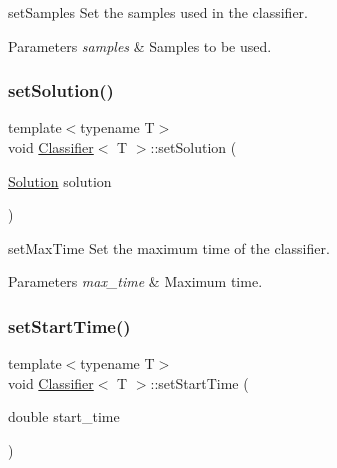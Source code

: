 set\+Samples Set the samples used in the classifier. 


\begin{DoxyParams}{Parameters}
{\em samples} & Samples to be used. \\
\hline
\end{DoxyParams}
\mbox{\label{class_classifier_a2eb8d760224eba3091c108155996d3d9}} 
\subsubsection{\texorpdfstring{set\+Solution()}{setSolution()}}
{\footnotesize\ttfamily template$<$typename T$>$ \\
void \mbox{\hyperlink{class_classifier}{Classifier}}$<$ T $>$\+::set\+Solution (\begin{DoxyParamCaption}\item[{\mbox{\hyperlink{class_solution}{Solution}}}]{solution }\end{DoxyParamCaption})\hspace{0.3cm}{\ttfamily [inline]}}



set\+Max\+Time Set the maximum time of the classifier. 


\begin{DoxyParams}{Parameters}
{\em max\+\_\+time} & Maximum time. \\
\hline
\end{DoxyParams}
\mbox{\label{class_classifier_a92fd489e75afe8b1bd2c88c478cf8f60}} 
\subsubsection{\texorpdfstring{set\+Start\+Time()}{setStartTime()}}
{\footnotesize\ttfamily template$<$typename T$>$ \\
void \mbox{\hyperlink{class_classifier}{Classifier}}$<$ T $>$\+::set\+Start\+Time (\begin{DoxyParamCaption}\item[{double}]{start\+\_\+time }\end{DoxyParamCaption})\hspace{0.3cm}{\ttfamily [inline]}}



